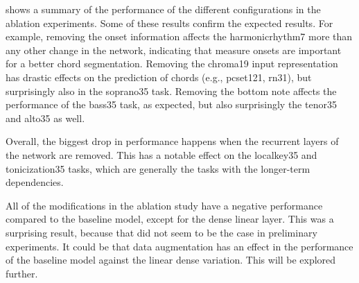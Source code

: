

 shows a summary of the performance of the
different configurations in the ablation experiments. Some
of these results confirm the expected results. For example,
removing the onset information affects the
\gls{harmonicrhythm7} more than any other change in the
network, indicating that measure onsets are important for a
better chord segmentation. Removing the \gls{chroma19} input
representation has drastic effects on the prediction of
chords (e.g., \gls{pcset121}, \gls{rn31}), but surprisingly
also in the \gls{soprano35} task. Removing the bottom note
affects the performance of the \gls{bass35} task, as
expected, but also surprisingly the \gls{tenor35} and
\gls{alto35} as well.

Overall, the biggest drop in performance happens when the
recurrent layers of the network are removed. This has a
notable effect on the \gls{localkey35} and
\gls{tonicization35} tasks, which are generally the tasks
with the longer-term dependencies. 

All of the modifications in the ablation study have a
negative performance compared to the baseline model, except
for the dense linear layer. This was a surprising result,
because that did not seem to be the case in preliminary
experiments. It could be that data augmentation has an
effect in the performance of the baseline model against the
linear dense variation. This will be explored further.
